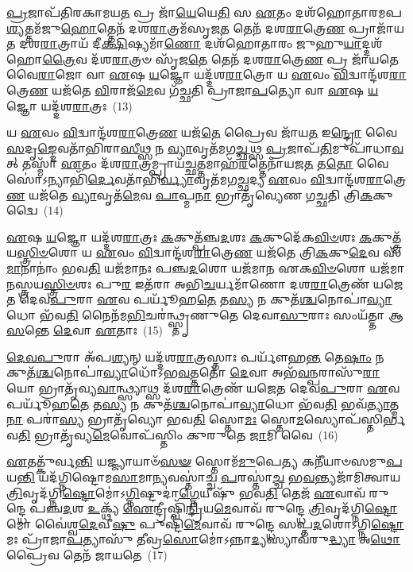 \-\ul{𑌪𑍍𑌰}\-𑌜𑌾𑌪᳴𑌤𑌿𑌰𑌕𑌾𑌮𑌯\-\ul{𑌤} 𑌪𑍍𑌰 𑌜𑌾᳴\-\ul{𑌯𑍇}\-𑌯𑍇\-\ul{𑌤𑌿} 𑌸 \ul{𑌏}\-𑌤𑌂 𑌦𑌶᳴𑌹𑍋𑌤𑌾𑌰𑌮𑌪\-\ul{𑌶𑍍𑌯}\-𑌤𑍍𑌤𑌮᳴𑌜𑍁\-\ul{𑌹𑍋}\-𑌤𑍍𑌤𑍇𑌨᳴ 𑌦𑌶\-\ul{𑌰𑌾}\-𑌤𑍍𑌰𑌮᳴𑌸𑍃𑌜\-\ul{𑌤} 𑌤𑍇𑌨᳴ 𑌦𑌶\-\ul{𑌰𑌾}\-𑌤𑍍𑌰𑍇\-\ul{𑌣} 𑌪𑍍𑌰𑌾𑌜𑌾᳴𑌯𑌤 𑌦𑌶\-\ul{𑌰𑌾}\-𑌤𑍍𑌰𑌾𑌯᳴ 𑌦𑍀\-\ul{𑌕𑍍𑌷𑌿}\-𑌷𑍍𑌯𑌮𑌾᳴\-\ul{𑌣𑍋} 𑌦𑌶᳴𑌹𑍋𑌤𑌾𑌰𑌂 𑌜𑍁𑌹𑍁\-\ul{𑌯𑌾}\-𑌦𑍍𑌦𑌶᳴𑌹𑍋\-\ul{𑌤𑍍𑌰𑍈}\-𑌵 𑌦᳴𑌶\-\ul{𑌰𑌾}\-𑌤𑍍𑌰𑍞 𑌸𑍃᳴𑌜\-\ul{𑌤𑍇} 𑌤𑍇𑌨᳴ 𑌦𑌶\-\ul{𑌰𑌾}\-𑌤𑍍𑌰𑍇\-\ul{𑌣} 𑌪𑍍𑌰 𑌜𑌾᳴𑌯𑌤𑍇 𑌵𑍈\-\ul{𑌰𑌾}\-𑌜𑍋 𑌵𑌾 \ul{𑌏}\-𑌷 \ul{𑌯}\-𑌜𑍍𑌞𑍋 𑌯𑌦𑍍𑌦᳴𑌶\-\ul{𑌰𑌾}\-𑌤𑍍𑌰𑍋 𑌯 \ul{𑌏}\-𑌵𑌂 \ul{𑌵𑌿}\-𑌦𑍍𑌵𑌾𑌨𑍍𑌦᳴𑌶\-\ul{𑌰𑌾}\-𑌤𑍍𑌰𑍇\-\ul{𑌣} 𑌯𑌜᳴𑌤𑍇 \ul{𑌵𑌿}\-𑌰𑌾𑌜᳴\-\ul{𑌮𑍇}\-𑌵 𑌗᳴𑌚𑍍𑌛𑌤𑌿 𑌪𑍍𑌰𑌾𑌜𑌾\-\ul{𑌪}\-𑌤𑍍𑌯𑍋 𑌵𑌾 \ul{𑌏}\-𑌷 \ul{𑌯}\-𑌜𑍍𑌞𑍋 𑌯𑌦𑍍𑌦᳴𑌶\-\ul{𑌰𑌾}\-𑌤𑍍𑌰𑌃~(13)

𑌯 \ul{𑌏}\-𑌵𑌂 \ul{𑌵𑌿}\-𑌦𑍍𑌵𑌾𑌨𑍍𑌦᳴𑌶\-\ul{𑌰𑌾}\-𑌤𑍍𑌰𑍇\-\ul{𑌣} 𑌯𑌜᳴\-\ul{𑌤𑍇} 𑌪𑍍𑌰𑍈𑌵 𑌜𑌾᳴𑌯\-\ul{𑌤} 𑌇\-\ul{𑌨𑍍𑌦𑍍𑌰𑍋} 𑌵𑍈 \ul{𑌸}\-𑌦𑍃\-\ul{𑌙𑍍𑌦𑍇}\-𑌵𑌤𑌾᳴𑌭𑌿𑌰𑌾\-\ul{𑌸𑍀}\-𑌥𑍍𑌸 𑌨 \ul{𑌵𑍍𑌯𑌾}\-𑌵𑍃𑌤᳴𑌮𑌗\-\ul{𑌚𑍍𑌛}\-𑌥𑍍𑌸 \ul{𑌪𑍍𑌰}\-𑌜𑌾𑌪᳴\-\ul{𑌤𑌿}\-𑌮𑍁𑌪𑌾᳴𑌧𑌾\-\ul{𑌵}\-𑌤𑍍 𑌤𑌸𑍍𑌮𑌾᳴ \ul{𑌏}\-𑌤𑌂 𑌦᳴𑌶\-\ul{𑌰𑌾}\-𑌤𑍍𑌰𑌮𑍍𑌪𑍍𑌰𑌾𑌯᳴\-\ul{𑌚𑍍𑌛}\-𑌤𑍍𑌤𑌮𑌾𑌹᳴\-\ul{𑌰}\-𑌤𑍍𑌤𑍇𑌨𑌾᳴𑌯𑌜\-\ul{𑌤} 𑌤\-\ul{𑌤𑍋} 𑌵𑍈 𑌸𑍋॑\-𑌽𑌨𑍍𑌯𑌾𑌭𑌿᳴\-\ul{𑌰𑍍𑌦𑍇}\-𑌵𑌤𑌾᳴𑌭𑌿\-\ul{𑌰𑍍𑌵𑍍𑌯𑌾}\-𑌵𑍃𑌤᳴𑌮𑌗\-\ul{𑌚𑍍𑌛}\-𑌦𑍍𑌯 \ul{𑌏}\-𑌵𑌂 \ul{𑌵𑌿}\-𑌦𑍍𑌵𑌾𑌨𑍍𑌦᳴𑌶\-\ul{𑌰𑌾}\-𑌤𑍍𑌰𑍇\-\ul{𑌣} 𑌯𑌜᳴𑌤𑍇 \ul{𑌵𑍍𑌯𑌾}\-𑌵𑍃𑌤᳴\-\ul{𑌮𑍇}\-𑌵 \ul{𑌪𑌾}\-𑌪𑍍𑌮\-\ul{𑌨𑌾} 𑌭𑍍𑌰𑌾𑌤𑍃᳴𑌵𑍍𑌯𑍇𑌣 𑌗𑌚𑍍𑌛𑌤𑌿 𑌤𑍍𑌰𑌿\-\ul{𑌕}\-𑌕𑍁𑌦𑍍𑌵𑍈~(14)

\-\ul{𑌏}\-𑌷 \ul{𑌯}\-𑌜𑍍𑌞𑍋 𑌯𑌦𑍍𑌦᳴𑌶\-\ul{𑌰𑌾}\-𑌤𑍍𑌰𑌃 \ul{𑌕}\-𑌕𑍁𑌤𑍍𑌪᳴𑌞𑍍𑌚\-\ul{𑌦}\-𑌶𑌃 \ul{𑌕}\-𑌕𑍁𑌦𑍇᳴𑌕\-\ul{𑌵𑌿}\-\-\ul{𑍞}\-𑌶𑌃 \ul{𑌕}\-𑌕𑍁𑌤𑍍𑌤𑍍𑌰᳴𑌯\-\ul{𑌸𑍍𑌤𑍍𑌰𑌿}\-\-\ul{𑍞}\-𑌶𑍋 𑌯 \ul{𑌏}\-𑌵𑌂 \ul{𑌵𑌿}\-𑌦𑍍𑌵𑌾𑌨𑍍𑌦᳴𑌶\-\ul{𑌰𑌾}\-𑌤𑍍𑌰𑍇\-\ul{𑌣} 𑌯𑌜᳴𑌤𑍇 𑌤𑍍𑌰𑌿\-\ul{𑌕}\-𑌕𑍁\-\ul{𑌦𑍇}\-𑌵 𑌸᳴\-\ul{𑌮𑌾}\-𑌨𑌾𑌨𑌾𑌂॑ 𑌭𑌵\-\ul{𑌤𑌿} 𑌯𑌜᳴𑌮𑌾𑌨𑌃 𑌪𑌞𑍍𑌚\-\ul{𑌦}\-𑌶𑍋 𑌯𑌜᳴𑌮𑌾𑌨 𑌏𑌕\-\ul{𑌵𑌿}\-\-\ul{𑍞}\-𑌶𑍋 𑌯𑌜᳴𑌮𑌾𑌨𑌸𑍍𑌤𑍍𑌰𑌯\-\ul{𑌸𑍍𑌤𑍍𑌰𑌿}\-\-\ul{𑍞}\-𑌶𑌃 𑌪𑍁\-\ul{𑌰} 𑌇𑌤᳴𑌰𑌾 𑌅𑌭𑌿\-\ul{𑌚}\-𑌰𑍍𑌯𑌮𑌾᳴𑌣𑍋 𑌦𑌶\-\ul{𑌰𑌾}\-𑌤𑍍𑌰𑍇𑌣᳴ 𑌯𑌜𑍇𑌤 𑌦𑍇𑌵\-\ul{𑌪𑍁}\-𑌰𑌾 \ul{𑌏}\-𑌵 𑌪𑌰𑍍𑌯𑍂᳴𑌹\-\ul{𑌤𑍇} 𑌤\-\ul{𑌸𑍍𑌯} 𑌨 𑌕𑍁𑌤᳴\-\ul{𑌶𑍍𑌚}\-𑌨𑍋𑌪𑌾॑\-\ul{𑌵𑍍𑌯𑌾}\-𑌧𑍋 𑌭᳴𑌵\-\ul{𑌤𑌿} 𑌨𑍈𑌨᳴𑌮\-\ul{𑌭𑌿}\-𑌚𑌰॑𑌨𑍍𑌥𑍍𑌸𑍍𑌤𑍃𑌣𑍁𑌤𑍇 𑌦𑍇𑌵𑌾\-\ul{𑌸𑍁}\-𑌰𑌾𑌃 𑌸𑌂𑌯᳴𑌤𑍍𑌤𑌾 𑌆\-\ul{𑌸}\-𑌨𑍍𑌤𑍇 \ul{𑌦𑍇}\-𑌵𑌾 \ul{𑌏}\-𑌤𑌾𑌃~(15)

\-\ul{𑌦𑍇}\-\-\ul{𑌵}\-\-\ul{𑌪𑍁}\-𑌰𑌾 𑌅᳴𑌪\-\ul{𑌶𑍍𑌯}\-𑌨𑍍 𑌯𑌦𑍍𑌦᳴𑌶\-\ul{𑌰𑌾}\-𑌤𑍍𑌰𑌸𑍍𑌤𑌾𑌃 𑌪𑌰𑍍𑌯𑍗᳴𑌹\-\ul{𑌨𑍍𑌤} 𑌤𑍇\-\ul{𑌷𑌾𑌂} 𑌨 𑌕𑍁𑌤᳴\-\ul{𑌶𑍍𑌚}\-𑌨𑍋𑌪𑌾॑\-\ul{𑌵𑍍𑌯𑌾}\-𑌧𑍋᳴\-𑌽𑌭\-\ul{𑌵}\-𑌤𑍍𑌤𑌤𑍋᳴ \ul{𑌦𑍇}\-𑌵𑌾 𑌅𑌭᳴\-\ul{𑌵}\-𑌨𑍍𑌪𑌰𑌾𑌸𑍁᳴\-\ul{𑌰𑌾} 𑌯𑍋 𑌭𑍍𑌰𑌾𑌤𑍃᳴𑌵𑍍𑌯\-\ul{𑌵𑌾}\-𑌨𑍍𑌥𑍍𑌸𑍍𑌯𑌾𑌥𑍍𑌸 𑌦᳴𑌶\-\ul{𑌰𑌾}\-𑌤𑍍𑌰𑍇𑌣᳴ 𑌯𑌜𑍇𑌤 𑌦𑍇𑌵\-\ul{𑌪𑍁}\-𑌰𑌾 \ul{𑌏}\-𑌵 𑌪𑌰𑍍𑌯𑍂᳴𑌹\-\ul{𑌤𑍇} 𑌤\-\ul{𑌸𑍍𑌯} 𑌨 𑌕𑍁𑌤᳴\-\ul{𑌶𑍍𑌚}\-𑌨𑍋𑌪𑌾॑\-\ul{𑌵𑍍𑌯𑌾}\-𑌧𑍋 𑌭᳴𑌵\-\ul{𑌤𑌿} 𑌭𑌵᳴\-\ul{𑌤𑍍𑌯𑌾}\-𑌤𑍍𑌮\-\ul{𑌨𑌾} 𑌪𑌰𑌾॑\-\ul{𑌸𑍍𑌯} 𑌭𑍍𑌰𑌾𑌤𑍃᳴𑌵𑍍𑌯𑍋 𑌭𑌵\-\ul{𑌤𑌿} 𑌸𑍍𑌤𑍋\-\ul{𑌮𑌃} 𑌸𑍍𑌤𑍋\-\ul{𑌮}\-𑌸𑍍𑌯𑍋𑌪᳴𑌸𑍍𑌤𑌿𑌰𑍍𑌭𑌵\-\ul{𑌤𑌿} 𑌭𑍍𑌰𑌾𑌤𑍃᳴𑌵𑍍𑌯\-\ul{𑌮𑍇}\-𑌵𑍋𑌪᳴𑌸𑍍𑌤𑌿𑌂 𑌕𑍁𑌰𑍁𑌤𑍇 \ul{𑌜𑌾}\-𑌮𑌿 𑌵𑍈~(16)

\-\ul{𑌏}\-𑌤𑌤𑍍𑌕𑍁᳴𑌰𑍍𑌵\-\ul{𑌨𑍍𑌤𑌿} 𑌯𑌜𑍍𑌜𑍍𑌯𑌾𑌯𑌾𑍞᳴\-\ul{𑌸}\-\-\ul{𑍟} 𑌸𑍍𑌤𑍋𑌮᳴\-\ul{𑌮𑍁}\-𑌪𑍇\-\ul{𑌤𑍍𑌯} 𑌕𑌨𑍀᳴𑌯𑌾𑍞𑌸𑌮𑍁\-\ul{𑌪}\-𑌯\-\ul{𑌨𑍍𑌤𑌿} 𑌯𑌦᳴𑌗𑍍𑌨𑌿𑌷𑍍𑌟𑍋𑌮\-\ul{𑌸𑌾}\-𑌮𑌾\-\ul{𑌨𑍍𑌯}\-𑌵𑌸𑍍𑌤𑌾॑𑌚𑍍𑌚 \ul{𑌪}\-𑌰𑌸𑍍𑌤𑌾॑\-\ul{𑌚𑍍𑌚} 𑌭\-\ul{𑌵}\-𑌨𑍍𑌤𑍍𑌯𑌜𑌾᳴𑌮𑌿𑌤𑍍𑌵𑌾𑌯 \ul{𑌤𑍍𑌰𑌿}\-𑌵𑍃𑌦᳴𑌗𑍍𑌨𑌿\-\ul{𑌷𑍍𑌟𑍋}\-𑌮𑍋॑\-𑌽\-\ul{𑌗𑍍𑌨𑌿}\-𑌷𑍍𑌟𑍁𑌦𑌾॑\-\ul{𑌗𑍍𑌨𑍇}\-𑌯𑍀𑌷𑍁᳴ 𑌭𑌵\-\ul{𑌤𑌿} 𑌤𑍇𑌜᳴ \ul{𑌏}\-𑌵𑌾𑌵᳴ 𑌰𑍁𑌨𑍍𑌦𑍍𑌧𑍇 𑌪𑌞𑍍𑌚\-\ul{𑌦}\-𑌶 \ul{𑌉}\-𑌕𑍍𑌥𑍍𑌯᳴ \ul{𑌐}\-𑌨𑍍𑌦𑍍𑌰𑍀𑌷𑍍𑌵𑌿᳴\-\ul{𑌨𑍍𑌦𑍍𑌰𑌿}\-𑌯\-\ul{𑌮𑍇}\-𑌵𑌾𑌵᳴ 𑌰𑍁𑌨𑍍𑌦𑍍𑌧𑍇 \ul{𑌤𑍍𑌰𑌿}\-𑌵𑍃𑌦᳴𑌗𑍍𑌨𑌿\-\ul{𑌷𑍍𑌟𑍋}\-𑌮𑍋 𑌵𑍈॑𑌶𑍍𑌵\-\ul{𑌦𑍇}\-𑌵𑍀\-\ul{𑌷𑍁} 𑌪𑍁𑌷𑍍𑌟𑌿᳴\-\ul{𑌮𑍇}\-𑌵𑌾𑌵᳴ 𑌰𑍁𑌨𑍍𑌦𑍍𑌧𑍇 𑌸𑌪𑍍𑌤\-\ul{𑌦}\-𑌶𑍋॑\-𑌽𑌗𑍍𑌨𑌿\-\ul{𑌷𑍍𑌟𑍋}\-𑌮𑌃 𑌪𑍍𑌰𑌾᳴𑌜𑌾\-\ul{𑌪}\-𑌤𑍍𑌯𑌾𑌸𑍁᳴ 𑌤𑍀𑌵𑍍𑌰\-\ul{𑌸𑍋}\-𑌮𑍋॑\-𑌽𑌨𑍍𑌨𑌾\-\ul{𑌦𑍍𑌯}\-𑌸𑍍𑌯𑌾𑌵᳴𑌰𑍁\-\ul{𑌦𑍍𑌧𑍍𑌯𑌾} 𑌅\-\ul{𑌥𑍋} 𑌪𑍍𑌰𑍈𑌵 𑌤𑍇𑌨᳴ 𑌜𑌾𑌯𑌤𑍇~(17)

